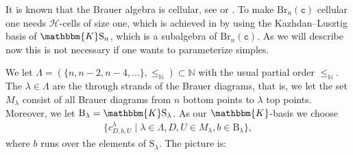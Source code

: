 \documentclass[a4paper,11pt]{amsart}
\renewcommand{\dots}{\text{...}}
\newcommand{\setstuff}[1]{\mathrm{#1}}
\newcommand{\KK}{\mathbbm{K}}
\newcommand{\N}{\mathbb{N}}
\newcommand{\varsym}[1]{\mathtt{#1}}
\newcommand{\cvar}{\varsym{c}}
\numberwithin{equation}{section}
\begin{document}
It is known that the Brauer algebra is cellular, see 
\cite[Section 4]{GrLe-cellular} or \cite[Section 5]{AnStTu-cellular-tilting}. 
To make $\setstuff{Br}_{n}(\cvar)$ cellular one needs 
$\mathcal{H}$-cells of size one, which is achieved in 
\cite[Section 4]{GrLe-cellular} by using the Kazhdan--Lusztig 
basis of $\KK\setstuff{S}_{n}$, which is 
a subalgebra of $\setstuff{Br}_{n}(\cvar)$.
As we will describe now this is not necessary if one wants 
to parameterize simples.

We let $\Lambda=(\{n,n-2,n-4,\dots\},\leq_{\N})\subset\N$ 
with the usual partial order $\leq_{\N}$.
The $\lambda\in\Lambda$ are the through strands of the Brauer diagrams,
that is, we let the set $M_{\lambda}$ consist of all Brauer diagrams 
from $n$ bottom points to $\lambda$ top points.
Moreover, we let $\setstuff{B}_{\lambda}=\KK\setstuff{S}_{\lambda}$.
As our $\KK$-basis we choose 
\begin{gather*}
\{c_{D,b,U}^{\lambda}\mid\lambda\in\Lambda,D,U\in M_{\lambda},
b\in\setstuff{B}_{\lambda}\},
\end{gather*}
where $b$ runs over the elements of $\setstuff{S}_{\lambda}$.
The picture is: 
\end{document}
